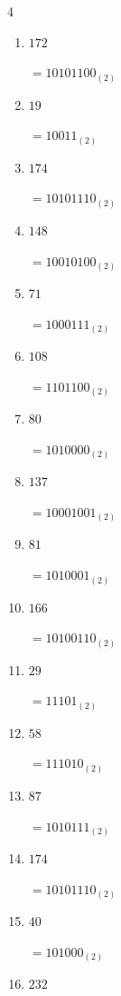 \begin{multicols}{4}
\begin{enumerate}
        $=1010101_{(2)}$

  \item $172$

        $=10101100_{(2)}$

\columnbreak %

\resetques

  \item $19$

        $=10011_{(2)}$

  \item $174$

        $=10101110_{(2)}$

  \item $148$

        $=10010100_{(2)}$

  \item $71$

        $=1000111_{(2)}$

  \item $108$

        $=1101100_{(2)}$

  \item $80$

        $=1010000_{(2)}$

  \item $137$

        $=10001001_{(2)}$

  \item $81$

        $=1010001_{(2)}$

  \item $166$

        $=10100110_{(2)}$

  \item $29$

        $=11101_{(2)}$

  \item $58$

        $=111010_{(2)}$

  \item $87$

        $=1010111_{(2)}$

  \item $174$

        $=10101110_{(2)}$

  \item $40$

        $=101000_{(2)}$

  \item $232$


\end{enumerate}
\end{multicols}
